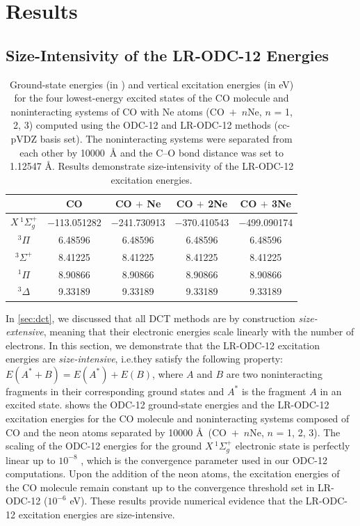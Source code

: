 \section{Results}
\label{sec:results}

\subsection{Size-Intensivity of the LR-ODC-12 Energies}
\label{sec:size_intensivity}

\begin{table}[h!]
    \centering
    \caption{%
        \label{tab:size_int}
        Ground-state energies (in \hartree) and vertical excitation energies (in
        eV) for the four lowest-energy excited states of the CO molecule and
        noninteracting systems of CO with Ne atoms (\mbox{CO $+$ $n$Ne}, $n$ =
        1, 2, 3) computed using the ODC-12 and LR-ODC-12 methods (cc-pVDZ basis
        set).
        The noninteracting systems were separated from each other by \mbox{10000
        \AA} and the C--O bond distance was set to 1.12547 \AA\@.
        Results demonstrate size-intensivity of the LR-ODC-12 excitation
        energies.
    }
    \begin{tabular}{ccccc}
        \hline
        \hline
        & CO & CO $+$ Ne & CO $+$ 2Ne & CO $+$ 3Ne \\
        \hline
        \({X}\,^1\Sigma_g^+\) & $-$113.051282 & $-$241.730913 & $-$370.410543 & $-$499.090174\\
        \({}^3\Pi\) & 6.48596 & 6.48596 & 6.48596 & 6.48596 \\
        \({}^3\Sigma^+\) & 8.41225 & 8.41225 & 8.41225 & 8.41225 \\
        \({}^1\Pi\) & 8.90866 & 8.90866 & 8.90866 & 8.90866 \\
        \({}^3\Delta\) & 9.33189 & 9.33189 & 9.33189 & 9.33189 \\
        \hline
        \hline
    \end{tabular}
\end{table}

In \cref{sec:dct}, we discussed that all DCT methods are by construction {\it size-extensive}, meaning that their electronic energies scale linearly with the number of electrons.
In this section, we demonstrate that the LR-ODC-12 excitation energies are {\it
size-intensive}, i.e.\@ they satisfy the following property: $E(A^*+B) = E(A^*)
+ E(B)$, where $A$ and $B$ are two noninteracting fragments in their
corresponding ground states and $A^*$ is the fragment $A$ in an excited state.
 shows the ODC-12 ground-state energies and the LR-ODC-12
excitation energies for the CO molecule and noninteracting systems composed of
CO and the neon atoms separated by 10000 \AA\ (\mbox{CO $+$ $n$Ne}, $n$ = 1, 2,
3).
The scaling of the ODC-12 energies for the ground \({X}\,^1\Sigma_g^+\)
electronic state is perfectly linear up to $10^{-8}$ \hartree, which is the
convergence parameter used in our ODC-12 computations.
Upon the addition of the neon atoms, the excitation energies of the CO molecule
remain constant up to the convergence threshold set in LR-ODC-12 ($10^{-6}$
eV).
These results provide numerical evidence that the LR-ODC-12 excitation energies
are size-intensive.


